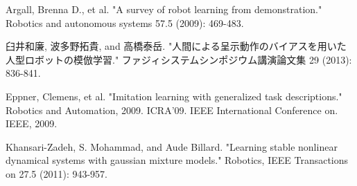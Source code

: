 \begin{thebibliography}{99}
Argall, Brenna D., et al. "A survey of robot learning from demonstration." Robotics and autonomous systems 57.5 (2009): 469-483.

臼井和廉, 波多野拓貴, and 高橋泰岳. "人間による呈示動作のバイアスを用いた人型ロボットの模倣学習." ファジィシステムシンポジウム講演論文集 29 (2013): 836-841.

Eppner, Clemens, et al. "Imitation learning with generalized task descriptions." Robotics and Automation, 2009. ICRA'09. IEEE International Conference on. IEEE, 2009.

Khansari-Zadeh, S. Mohammad, and Aude Billard. "Learning stable nonlinear dynamical systems with gaussian mixture models." Robotics, IEEE Transactions on 27.5 (2011): 943-957.

\end{thebibliography}


